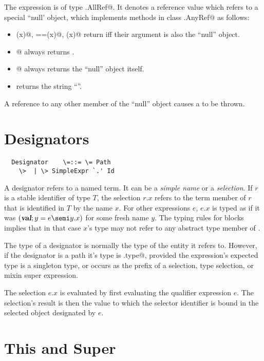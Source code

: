 \documentclass[11pt]{report}
\begin{document}
The \verb@null@ expression is of type \verb@scala.AllRef@. It
denotes a reference value which refers to a special ``null' object,
which implements methods in class \verb@scala.AnyRef@ as follows:
\begin{itemize}
\item[]
\verb@eq(x)@, \verb@==(x)@, \verb@equals(x)@ return \verb@true@ iff their
argument \verb@x@ is also the ``null'' object.
\item[]
\verb@isInstance[T]@ always returns \verb@false@.
\item[]
\verb@asInstance[T]@ always returns the ``null'' object itself.
\item[]
\verb@toString@ returns the string ``\verb@null@''.
\end{itemize}
A reference to any other member of the ``null'' object causes a
\verb@NullPointerException@ to be thrown. 

\section{Designators}
\label{sec:designators}

\syntax\begin{verbatim}
  Designator    \=::= \= Path
	\>  | \> SimpleExpr `.' Id
\end{verbatim}

A designator refers to a named term. It can be a {\em simple name} or
a {\em selection}. If $r$ is a stable identifier of type $T$, the
selection $r.x$ refers to the term member of $r$ that is identified in
$T$ by the name $x$.  For other expressions $e$, $e.x$ is typed as if
it was $(\VAL;y=e\semi y.x)$ for some fresh name $y$. The typing rules
for blocks implies that in that case $x$'s type may not refer to any
abstract type member of \verb@e@.

The type of a designator is normally the type of the entity it refers
to. However, if the designator is a path  \verb@p@
it's type is \verb@p.type@, provided the expression's expected type is
a singleton type, or \verb@p@ occurs as the prefix of a selection,
type selection, or mixin super expression.

The selection $e.x$ is evaluated by first evaluating the qualifier
expression $e$. The selection's result is then the value to which the
selector identifier is bound in the selected object designated by $e$.

\section{This and Super}
\label{sec:this-super}
\end{document}
